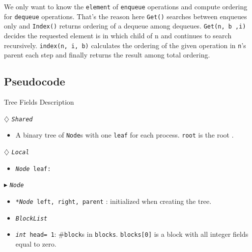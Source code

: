 \documentclass[10pt]{article}
\newcommand{\sub}[1]{\textsubscript{#1}}
\renewcommand{\tt}[1]{\texttt{#1}}
\renewcommand{\sl}[1]{\textsl{#1}}
\renewcommand{\bf}[1]{\textbf{#1}}
\newcommand{\nf}[1]{{\normalfont{\texttt{#1}}}}
\newcommand{\head}{head}
\theoremstyle{definition}
\begin{document}
We only want to know the \texttt{element} of \texttt{enqueue} operations and compute ordering for \texttt{dequeue} operations. That's the reason here \texttt{Get()} searches between enqueues only and \texttt{Index()} returns ordering of a dequeue among dequeues. \texttt{Get(n, b ,i)} decides the requested element is in which child of n and continues to search recursively. \texttt{index(n, i, b)} calculates the ordering of the given operation in \texttt{n}'s parent each step and finally returns the result among total ordering.



\pagebreak
\subsection{Pseudocode}

\begin{algorithm}
\caption{Tree Fields Description}
\begin{algorithmic}[1]
\setcounter{ALG@line}{100}
\begin{multicols}{2}


\Statex $\diamondsuit$ \tt{\sl{Shared}}
\begin{itemize}
\item \textsf{A binary tree of \tt{Node}s with one \tt{leaf} for each process. \tt{root} is the root \nf{node}.}
\end{itemize}

\Statex $\diamondsuit$ \tt{\sl{Local}}
\begin{itemize}
\item \tt{\sl{Node} leaf:} 
\end{itemize}



\Statex $\blacktriangleright$ \tt{\sl{Node}}
\begin{itemize}
\item \tt{\sl{*Node} left, right, parent} \textsf{: initialized  when creating the tree.}
\item \tt{\sl{BlockList}}
\item \tt{\sl{int} \head= 1}\textsf{: \#\tt{block}s in \tt{blocks}. \tt{blocks[0]} is a block with all integer fields equal to zero.}
\end{itemize}


\end{multicols}
\end{algorithmic}
\end{algorithm}
\end{document}
